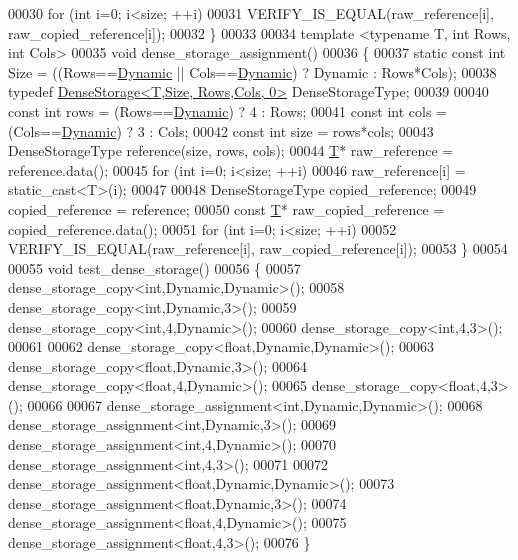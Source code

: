\begin{DoxyCode}
00030   \textcolor{keywordflow}{for} (\textcolor{keywordtype}{int} i=0; i<size; ++i)
00031     VERIFY\_IS\_EQUAL(raw\_reference[i], raw\_copied\_reference[i]);
00032 \}
00033 
00034 \textcolor{keyword}{template} <\textcolor{keyword}{typename} T, \textcolor{keywordtype}{int} Rows, \textcolor{keywordtype}{int} Cols>
00035 \textcolor{keywordtype}{void} dense\_storage\_assignment()
00036 \{
00037   \textcolor{keyword}{static} \textcolor{keyword}{const} \textcolor{keywordtype}{int} Size = ((Rows==\hyperlink{namespace_eigen_ad81fa7195215a0ce30017dfac309f0b2}{Dynamic} || Cols==\hyperlink{namespace_eigen_ad81fa7195215a0ce30017dfac309f0b2}{Dynamic}) ? Dynamic : Rows*Cols);
00038   \textcolor{keyword}{typedef} \hyperlink{class_eigen_1_1_dense_storage}{DenseStorage<T,Size, Rows,Cols, 0>} DenseStorageType;
00039   
00040   \textcolor{keyword}{const} \textcolor{keywordtype}{int} rows = (Rows==\hyperlink{namespace_eigen_ad81fa7195215a0ce30017dfac309f0b2}{Dynamic}) ? 4 : Rows;
00041   \textcolor{keyword}{const} \textcolor{keywordtype}{int} cols = (Cols==\hyperlink{namespace_eigen_ad81fa7195215a0ce30017dfac309f0b2}{Dynamic}) ? 3 : Cols;
00042   \textcolor{keyword}{const} \textcolor{keywordtype}{int} size = rows*cols;
00043   DenseStorageType reference(size, rows, cols);
00044   \hyperlink{group___sparse_core___module}{T}* raw\_reference = reference.data();
00045   \textcolor{keywordflow}{for} (\textcolor{keywordtype}{int} i=0; i<size; ++i)
00046     raw\_reference[i] = static\_cast<T>(i);
00047     
00048   DenseStorageType copied\_reference;
00049   copied\_reference = reference;
00050   \textcolor{keyword}{const} \hyperlink{group___sparse_core___module}{T}* raw\_copied\_reference = copied\_reference.data();
00051   \textcolor{keywordflow}{for} (\textcolor{keywordtype}{int} i=0; i<size; ++i)
00052     VERIFY\_IS\_EQUAL(raw\_reference[i], raw\_copied\_reference[i]);
00053 \}
00054 
00055 \textcolor{keywordtype}{void} test\_dense\_storage()
00056 \{
00057   dense\_storage\_copy<int,Dynamic,Dynamic>();  
00058   dense\_storage\_copy<int,Dynamic,3>();
00059   dense\_storage\_copy<int,4,Dynamic>();
00060   dense\_storage\_copy<int,4,3>();
00061 
00062   dense\_storage\_copy<float,Dynamic,Dynamic>();
00063   dense\_storage\_copy<float,Dynamic,3>();
00064   dense\_storage\_copy<float,4,Dynamic>();  
00065   dense\_storage\_copy<float,4,3>();
00066   
00067   dense\_storage\_assignment<int,Dynamic,Dynamic>();  
00068   dense\_storage\_assignment<int,Dynamic,3>();
00069   dense\_storage\_assignment<int,4,Dynamic>();
00070   dense\_storage\_assignment<int,4,3>();
00071 
00072   dense\_storage\_assignment<float,Dynamic,Dynamic>();
00073   dense\_storage\_assignment<float,Dynamic,3>();
00074   dense\_storage\_assignment<float,4,Dynamic>();  
00075   dense\_storage\_assignment<float,4,3>();  
00076 \}
\end{DoxyCode}
